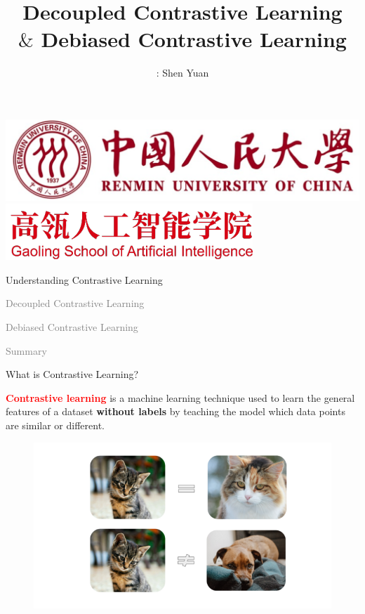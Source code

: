 \documentclass[aspectratio=169,mathserif]{beamer}  %
\title[11.18Pre]{\huge{\textbf{Decoupled Contrastive Learning \\ $\&$ Debiased Contrastive Learning}}}
\author{
\tb{presenter}: Shen Yuan
}
\date{}
\newcommand{\light}[1]{\textcolor{gray}{#1}}
\newcommand{\tb}{\textbf}
\newcommand{\red}{\textcolor{red}}
\begin{document}
 


\begin{frame}
  \titlepage
  \vspace{-1cm}
  \centering
  \includegraphics[width=0.4\linewidth]{ruc_logo.png}\quad
  \includegraphics[width=0.4\linewidth]{GSAI_logo.png}
\end{frame}



\begin{frame}[noframenumbering]
\begin{itemize}
    \begin{LARGE}
    \item Understanding Contrastive Learning
    \item \light{Decoupled Contrastive Learning}
    \item \light{Debiased Contrastive Learning}
    \item \light{Summary}
    \end{LARGE}
\end{itemize}
\end{frame}



\begin{frame}{What is Contrastive Learning?}

\red{\tb{Contrastive learning}} is a machine learning technique used to learn the general features of a dataset \tb{without labels} by teaching the model which data points are similar or different.

\pause 

\begin{figure}[t]
\centerline{\includegraphics[width=0.7\linewidth]{figure2.png}}
\label{fig1}
\end{figure}

\end{frame}
\end{document}
